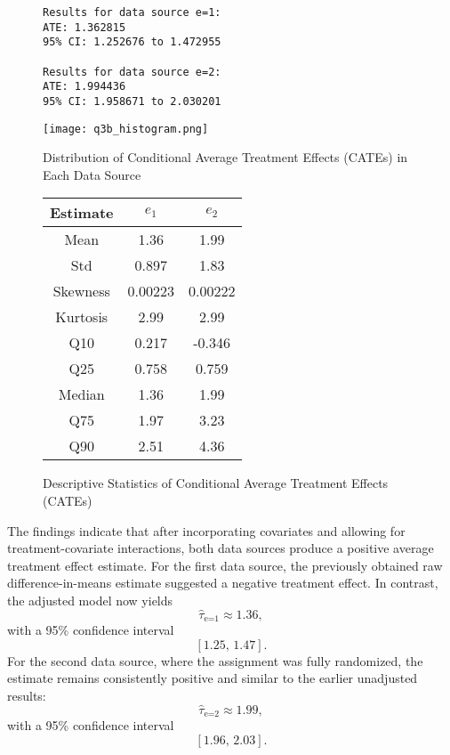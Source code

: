 \documentclass{article}
\begin{document}
\begin{figure}[H]
  \begin{lstlisting}[style=RstyleComment, caption=ATE and Confidence Interval Estimates Ignoring Covariates]
Results for data source e=1:
ATE: 1.362815 
95% CI: 1.252676 to 1.472955 

Results for data source e=2:
ATE: 1.994436 
95% CI: 1.958671 to 2.030201
  \end{lstlisting}
\end{figure}


\begin{figure}[H]
  \centering
  \texttt{[image: q3b\_histogram.png]}
  \caption{Distribution of Conditional Average Treatment Effects (CATEs) in Each Data Source}
\end{figure}

\begin{figure}
  \begin{center}
    \renewcommand{\arraystretch}{1.5}
    \begin{tabular}{|c|c|c|}
      \hline
      \textbf{Estimate} & $e_1$ & $e_2$ \\ \hline
      Mean     & 1.36    &  1.99    \\ \hline
      Std      & 0.897   &  1.83    \\ \hline
      Skewness & 0.00223 &  0.00222 \\ \hline
      Kurtosis & 2.99    &  2.99    \\ \hline
      Q10      & 0.217   & -0.346   \\ \hline
      Q25      & 0.758   &  0.759   \\ \hline
      Median   & 1.36    &  1.99    \\ \hline
      Q75      & 1.97    &  3.23    \\ \hline
      Q90      & 2.51    &  4.36    \\ \hline
    \end{tabular}
  \end{center}
  \caption{Descriptive Statistics of Conditional Average Treatment Effects (CATEs)}
\end{figure}

The findings indicate that after incorporating covariates and allowing for treatment-covariate interactions, both data sources produce a positive average treatment effect estimate. For the first data source, the previously obtained raw difference-in-means estimate suggested a negative treatment effect. In contrast, the adjusted model now yields 
\[
\widehat{\tau}_{\text{e=1}} \approx 1.36,
\]
with a 95\% confidence interval 
\[
[1.25,\, 1.47].
\]
For the second data source, where the assignment was fully randomized, the estimate remains consistently positive and similar to the earlier unadjusted results:
\[
\widehat{\tau}_{\text{e=2}} \approx 1.99,
\]
with a 95\% confidence interval 
\[
[1.96,\, 2.03].
\]
\end{document}
